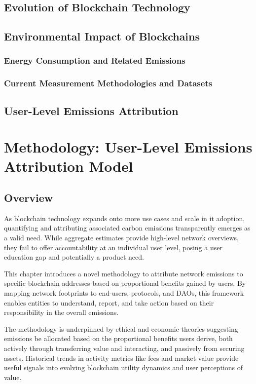 \documentclass[11pt]{report}
\begin{document}
\section{Evolution of Blockchain Technology}
\section{Environmental Impact of Blockchains}
\subsection{Energy Consumption and Related Emissions}
\subsection{Current Measurement Methodologies and Datasets}
\section{User-Level Emissions Attribution}


\chapter{Methodology: User-Level Emissions Attribution Model}
\section{Overview}


As blockchain technology expands onto more use cases and scale in it adoption, quantifying and attributing associated carbon emissions transparently emerges as a valid need. While aggregate estimates provide high-level network overviews, they fail to offer accountability at an individual user level, posing a user education gap and potentially a product need.

This chapter introduces a novel methodology to attribute network emissions to specific blockchain addresses based on proportional benefits gained by users. By mapping network footprints to end-users, protocols, and DAOs, this framework enables entities to understand, report, and take action based on their responsibility in the overall emissions.

The methodology is underpinned by ethical and economic theories suggesting emissions be allocated based on the proportional benefits users derive, both actively through transferring value and interacting, and passively from securing assets. Historical trends in activity metrics like fees and market value provide useful signals into evolving blockchain utility dynamics and user perceptions of value.
\end{document}
